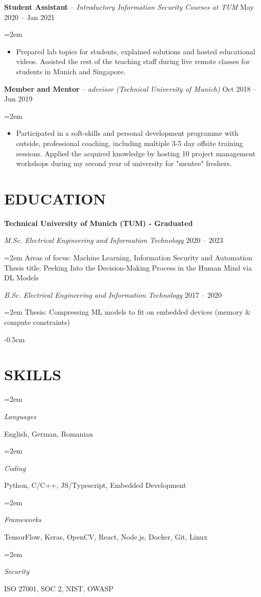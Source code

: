 \documentclass[paper=a4,fontsize=11pt]{scrartcl}
\newlength{\spacebox}
\newcommand{\sepspace}{\vspace*{0.35em}}		%
\newcommand{\NewPart}[1]{\section*{\uppercase{#1}}}
\newcommand{\PersonalEntry}[2]{
		\noindent\hangindent=2em\hangafter=0 %
		\parbox{\spacebox}{        %
		\textit{#1}}		       %
		\hspace{1.5em} #2 \par}    %
\newcommand{\SkillsEntry}[2]{      %
		\noindent\hangindent=2em\hangafter=0 %
		\parbox{\spacebox}{        %
		\textit{#1}}			   %
		\hspace{2.5em} #2 \par}    %
\newcommand{\EducationEntry}[4]{
		\noindent \textit{#1} \hfill      %
		\colorbox{custom_gray}{\color{white}#2} \par  %
		\noindent\hangindent=2em\hangafter=0 \small #3 %
		\normalsize \par}
\newcommand{\WorkEntry}[4]{				  %
		\noindent \textbf{#1} – \textit{#3} \hfill      %
		\colorbox{custom_gray}{\color{white}#2} \par  %
		\noindent\hangindent=2em\hangafter=0 \small #4 %
		\normalsize \par}
\begin{document}
\WorkEntry{Student Assistant}{May 2020 – Jan 2021}{Introductory Information Security Courses at TUM}
{
\begin{itemize}
  \item Prepared lab topics for students, explained solutions and hosted educational videos. Assisted the rest of the teaching staff during live remote classes for students in Munich and Singapore.
\end{itemize}
}

\WorkEntry{Member and Mentor}{Oct 2018 – Jun 2019}{adveisor (Technical University of Munich)}
{
\begin{itemize}
	\item Participated in a soft-skills and personal development programme with outside, professional coaching, including multiple 3-5 day offsite training sessions. Applied the acquired knowledge by hosting 10 project management workshops during my second year of university for "mentee" freshers.
\end{itemize}
}


\vspace{-0.5cm}
\NewPart{Education}{}
\vspace{-0.3cm}
\textbf{Technical University of Munich (TUM) - Graduated}

\EducationEntry{M.Sc. Electrical Engineering and Information Technology}{2020 – 2023}{Areas of focus: Machine Learning, Information Security and Automation \\
Thesis title: Peeking Into the Decision-Making Process in the Human Mind via DL Models}
\sepspace

\EducationEntry{B.Sc. Electrical Engineering and Information Technology}{2017 – 2020} {Thesis: Compressing ML models to fit on embedded devices (memory \& compute constraints)}


\vspace{-0.5cm}
\NewPart{Skills}{}

\SkillsEntry{Languages}{English, German, Romanian}
\SkillsEntry{Coding}{Python, \textsc{C/C++}, JS/Typescript, Embedded Development}
\SkillsEntry{Frameworks}{TensorFlow, Keras, OpenCV, React, Node.js, Docker, Git, Linux}
\SkillsEntry{Security}{ISO 27001, SOC 2, NIST, OWASP}


\end{document}
